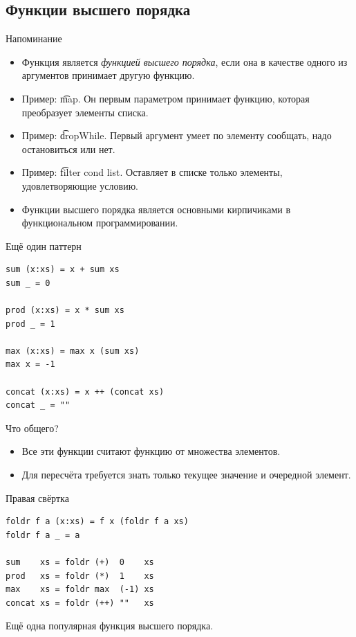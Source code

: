\subsection{Функции высшего порядка}

\begin{frame}
\end{frame}

\begin{frame}{Напоминание}
	\begin{itemize}
		\item Функция является \textit{функцией высшего порядка}, если она в качестве одного из аргументов принимает другую функцию.
		\item Пример: \t{map}. Он первым параметром принимает функцию, которая преобразует элементы списка.
		\item Пример: \t{dropWhile}. Первый аргумент умеет по элементу сообщать, надо остановиться или нет.
		\item Пример: \t{filter cond list}. Оставляет в списке только элементы, удовлетворяющие условию.
		\item Функции высшего порядка является основными кирпичиками в функциональном программировании.
	\end{itemize}
\end{frame}

\begin{frame}[fragile]{Ещё один паттерн}
\begin{verbatim}
sum (x:xs) = x + sum xs
sum _ = 0

prod (x:xs) = x * sum xs
prod _ = 1

max (x:xs) = max x (sum xs)
max x = -1

concat (x:xs) = x ++ (concat xs)
concat _ = ""
\end{verbatim}
	Что общего?
	\pause
	\begin{itemize}
		\item Все эти функции считают функцию от множества элементов.
		\item Для пересчёта требуется знать только текущее значение и очередной элемент.
	\end{itemize}
\end{frame}

\begin{frame}[t,fragile]{Правая свёртка}
\begin{verbatim}
foldr f a (x:xs) = f x (foldr f a xs)
foldr f a _ = a

sum    xs = foldr (+)  0    xs
prod   xs = foldr (*)  1    xs
max    xs = foldr max  (-1) xs
concat xs = foldr (++) ""   xs
\end{verbatim}
	Ещё одна популярная функция высшего порядка.
\end{frame}

